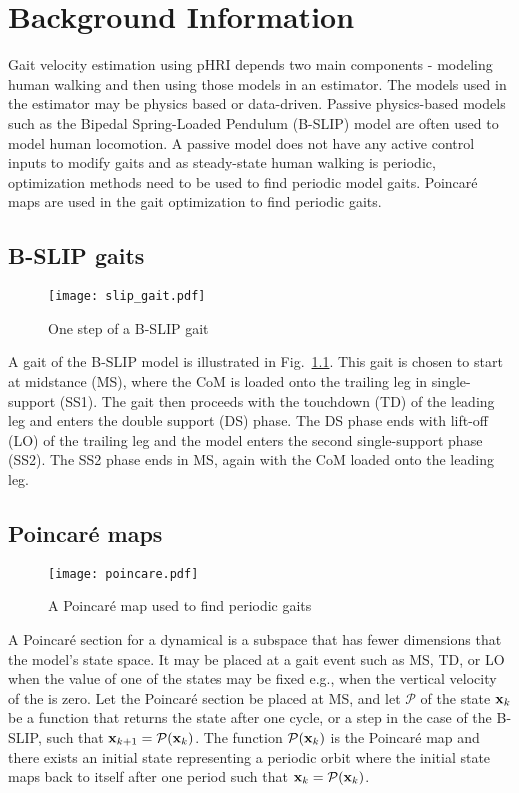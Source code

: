 \chapter{Background Information}

Gait velocity estimation using pHRI depends two main components - modeling human walking and then using those models in an estimator. The models used in the estimator may be physics based or data-driven. Passive physics-based models such as the Bipedal Spring-Loaded Pendulum (B-SLIP) \cite{geyer2006compliant,liu2015dynamic} model are often used to model human locomotion. A passive model does not have any active control inputs to modify gaits and as steady-state human walking is periodic, optimization methods need to be used to find periodic model gaits. Poincar\'e maps are used in the gait optimization \cite{strogatz2018nonlinear,garcia1998simplest} to find periodic gaits.

\section{B-SLIP gaits}
\begin{figure}
	\centering
	\texttt{[image: slip\_gait.pdf]}
	\caption{One step of a B-SLIP gait}\label{fig:slip_gait}
\end{figure} 

A gait of the B-SLIP model is illustrated in Fig.~\ref{fig:slip_gait}. This gait is chosen to start at midstance (MS), where the CoM is loaded onto the trailing leg in single-support (SS1). The gait then proceeds with the touchdown (TD) of the leading leg and enters the double support (DS) phase. The DS phase ends with lift-off (LO) of the trailing leg and the model enters the second single-support phase (SS2). The SS2 phase ends in MS, again with the CoM loaded onto the leading leg.

\section{Poincar\'e maps}
\begin{figure}
	\centering
	\texttt{[image: poincare.pdf]}
	\caption{A Poincar\'e map used to find periodic gaits}\label{fig:poincare}
\end{figure}

A Poincar\'e section for a dynamical is a subspace that has fewer dimensions that the model's state space. It may be placed at a gait event such as MS, TD, or LO when the value of one of the states may be fixed e.g., when the vertical velocity of the \COM is zero. Let the Poincar\'e section be placed at MS, and let $ \mathcal{P} $ of the state $ \mathbf{x}_k $ be a function that returns the state after one cycle, or a step in the case of the B-SLIP, such that $ \mathbf{x}_{k+1} = \mathcal{P}(\mathbf{x}_k) $. The function $ \mathcal{P}(\mathbf{x}_k) $ is the Poincar\'e map and there exists an initial state representing a periodic orbit where the initial state maps back to itself after one period such that $ \mathbf{x}_k = \mathcal{P}(\mathbf{x}_k) $.
%
%


